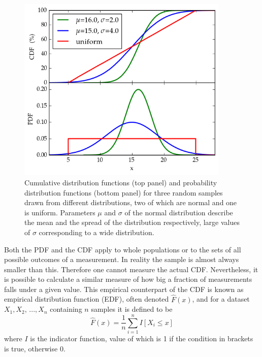 \documentclass[english, oneside]{HYgradu}
\begin{document}
\begin{figure}
   \centering
   \includegraphics[width=0.9\textwidth]{kuvat/cdf.png}
   \caption{Cumulative distribution functions (top panel) and probability distribution functions (bottom panel) for three random samples drawn from different distributions, two of which are normal and one is uniform. Parameters $\mu$ and $\sigma$ of the normal distribution describe the mean and the spread of the distribution respectively, large values of $\sigma$ corresponding to a wide distribution.}
   \label{fig:cdf}

\end{figure}

Both the PDF and the CDF apply to whole populations or to the sets of all possible outcomes of a measurement. In reality the sample is almost always smaller than this. Therefore one cannot measure the actual CDF. Nevertheless, it is possible to calculate a similar measure of how big a fraction of measurements falls under a given value. This empirical counterpart of the CDF is known as empirical distribution function (EDF), often denoted $\hat F(x)$, and for a dataset $X_1, X_2,\,..., X_n$ containing $n$ samples it is defined to be
\begin{equation}
	\hat F(x) = \frac{1}{n}\sum_{i=1}^n I[X_i \leq x]
\end{equation}
where $I$ is the indicator function, value of which is 1 if the condition in brackets is true, otherwise 0. \citep{feigelson2012modern}
\end{document}
